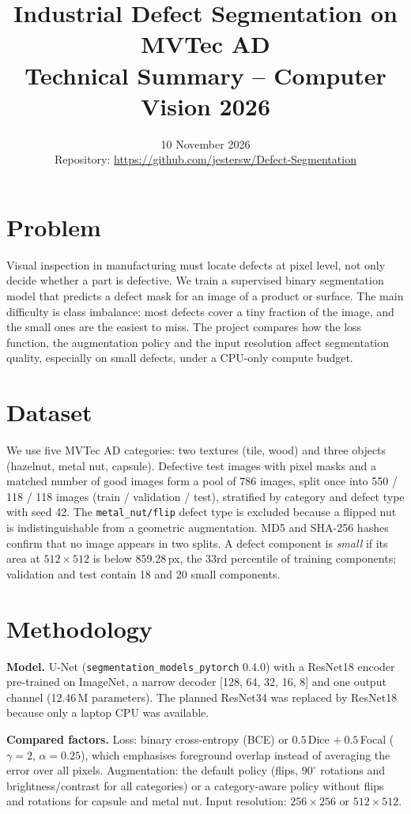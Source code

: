 \documentclass[10pt,a4paper]{article}
\title{\textbf{Industrial Defect Segmentation on MVTec AD}\\[2pt]\large Technical Summary -- Computer Vision 2026}
\date{10 November 2026\\[2pt]\small Repository: \url{https://github.com/jestersw/Defect-Segmentation}}
\begin{document}
\maketitle
\vspace{-2em}

\section{Problem}

Visual inspection in manufacturing must locate defects at pixel level, not only decide whether a part is defective. We train a supervised binary segmentation model that predicts a defect mask for an image of a product or surface. The main difficulty is class imbalance: most defects cover a tiny fraction of the image, and the small ones are the easiest to miss. The project compares how the loss function, the augmentation policy and the input resolution affect segmentation quality, especially on small defects, under a CPU-only compute budget.

\section{Dataset}

We use five MVTec AD categories: two textures (tile, wood) and three objects (hazelnut, metal nut, capsule). Defective test images with pixel masks and a matched number of good images form a pool of 786 images, split once into 550 / 118 / 118 images (train / validation / test), stratified by category and defect type with seed 42. The \texttt{metal\_nut/flip} defect type is excluded because a flipped nut is indistinguishable from a geometric augmentation. MD5 and SHA-256 hashes confirm that no image appears in two splits. A defect component is \emph{small} if its area at $512\times512$ is below 859.28\,px, the 33rd percentile of training components; validation and test contain 18 and 20 small components.

\section{Methodology}

\textbf{Model.} U-Net (\texttt{segmentation\_models\_pytorch} 0.4.0) with a ResNet18 encoder pre-trained on ImageNet, a narrow decoder [128, 64, 32, 16, 8] and one output channel (12.46\,M parameters). The planned ResNet34 was replaced by ResNet18 because only a laptop CPU was available.

\textbf{Compared factors.} Loss: binary cross-entropy (BCE) or $0.5\,$Dice $+\ 0.5\,$Focal ($\gamma=2$, $\alpha=0.25$), which emphasises foreground overlap instead of averaging the error over all pixels. Augmentation: the default policy (flips, $90^\circ$ rotations and brightness/contrast for all categories) or a category-aware policy without flips and rotations for capsule and metal nut. Input resolution: $256\times256$ or $512\times512$.
\end{document}
